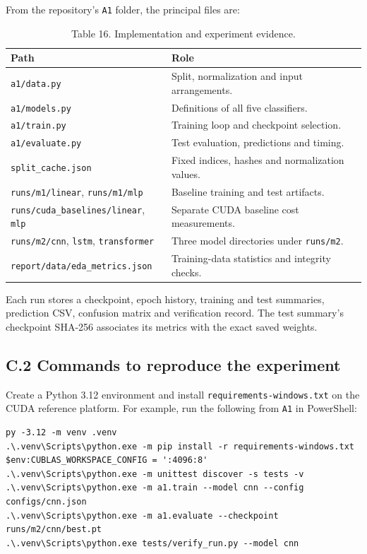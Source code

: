 From the repository's \texttt{A1} folder, the principal files are:
\begin{table}[H]\centering\small
\caption{Table 16. Implementation and experiment evidence.}
\begin{tabularx}{\linewidth}{p{.46\linewidth}X}\toprule
Path & Role\\\midrule
\texttt{a1/data.py} & Split, normalization and input arrangements.\\
\texttt{a1/models.py} & Definitions of all five classifiers.\\
\texttt{a1/train.py} & Training loop and checkpoint selection.\\
\texttt{a1/evaluate.py} & Test evaluation, predictions and timing.\\
\texttt{split\_cache.json} & Fixed indices, hashes and normalization values.\\
\texttt{runs/m1/linear}, \texttt{runs/m1/mlp} & Baseline training and test artifacts.\\
\texttt{runs/cuda\_baselines/linear}, \texttt{mlp} & Separate CUDA baseline cost measurements.\\
\texttt{runs/m2/cnn}, \texttt{lstm}, \texttt{transformer} & Three model directories under \texttt{runs/m2}.\\
\texttt{report/data/eda\_metrics.json} & Training-data statistics and integrity checks.\\\bottomrule
\end{tabularx}
\end{table}

Each run stores a checkpoint, epoch history, training and test summaries,
prediction CSV, confusion matrix and verification record. The test summary's
checkpoint SHA-256 associates its metrics with the exact saved weights.

\subsection{C.2 Commands to reproduce the experiment}
Create a Python 3.12 environment and install
\texttt{requirements-windows.txt} on the CUDA reference platform. For example,
run the following from \texttt{A1} in PowerShell:
\footnotesize
\begin{verbatim}
py -3.12 -m venv .venv
.\.venv\Scripts\python.exe -m pip install -r requirements-windows.txt
$env:CUBLAS_WORKSPACE_CONFIG = ':4096:8'
.\.venv\Scripts\python.exe -m unittest discover -s tests -v
.\.venv\Scripts\python.exe -m a1.train --model cnn --config configs/cnn.json
.\.venv\Scripts\python.exe -m a1.evaluate --checkpoint runs/m2/cnn/best.pt
.\.venv\Scripts\python.exe tests/verify_run.py --model cnn
\end{verbatim}


